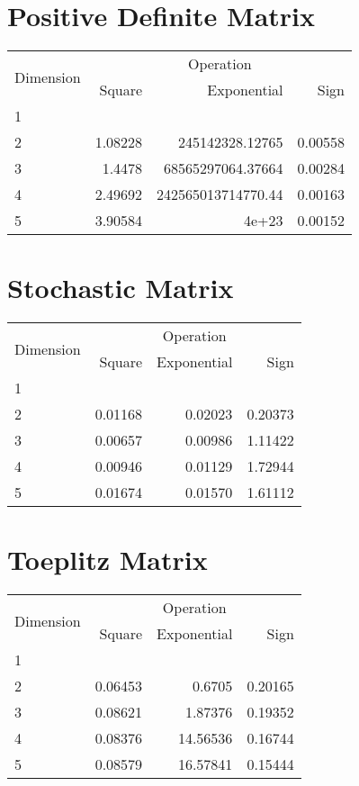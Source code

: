 \documentclass{article}
\begin{document}
\section{Positive Definite Matrix}
\begin{tabular}{@{}lrrr@{}}
\toprule
\multirow{2}{*}{Dimension} & \multicolumn{3}{c}{Operation} \\
\cmidrule(l){2-4}
& Square & Exponential & Sign \\
\midrule
1 & & & \\
2 & 1.08228 & 245142328.12765 & 0.00558 \\
3 & 1.4478 & 68565297064.37664 & 0.00284 \\
4 & 2.49692 & 242565013714770.44 & 0.00163 \\
5 & 3.90584 & 4e+23 & 0.00152 \\
\bottomrule
\end{tabular}

\section{Stochastic Matrix}
\begin{tabular}{@{}lrrr@{}}
\toprule
\multirow{2}{*}{Dimension} & \multicolumn{3}{c}{Operation} \\
\cmidrule(l){2-4}
& Square & Exponential & Sign \\
\midrule
1 & & & \\
2 & 0.01168 & 0.02023 & 0.20373 \\
3 & 0.00657 & 0.00986 & 1.11422 \\
4 & 0.00946 & 0.01129 & 1.72944 \\
5 & 0.01674 & 0.01570 & 1.61112 \\
\bottomrule
\end{tabular}

\section{Toeplitz Matrix}
\begin{tabular}{@{}lrrr@{}}
\toprule
\multirow{2}{*}{Dimension} & \multicolumn{3}{c}{Operation} \\
\cmidrule(l){2-4}
& Square & Exponential & Sign \\
\midrule
1 & & & \\
2 & 0.06453 & 0.6705 & 0.20165 \\
3 & 0.08621 & 1.87376 & 0.19352 \\
4 & 0.08376 & 14.56536 & 0.16744 \\
5 & 0.08579 & 16.57841 & 0.15444 \\
\bottomrule
\end{tabular}
\end{document}
